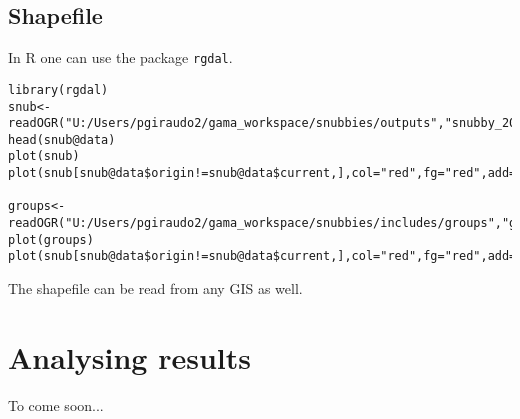 \subsection{Shapefile}

In R one can use the package \texttt{rgdal}. 

\begin{lstlisting}
library(rgdal)
snub<-readOGR("U:/Users/pgiraudo2/gama_workspace/snubbies/outputs","snubby_2019_4392")
head(snub@data)
plot(snub)
plot(snub[snub@data$origin!=snub@data$current,],col="red",fg="red",add=TRUE)

groups<-readOGR("U:/Users/pgiraudo2/gama_workspace/snubbies/includes/groups","groups")
plot(groups)
plot(snub[snub@data$origin!=snub@data$current,],col="red",fg="red",add=TRUE)

\end{lstlisting}


The shapefile can be read from any GIS as well. 


\section{Analysing results}




To come soon...